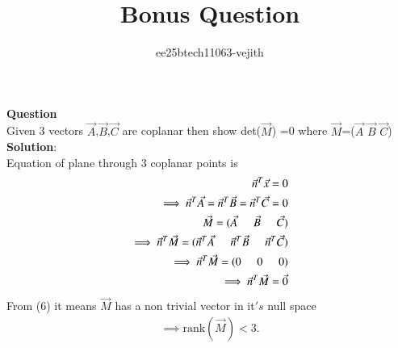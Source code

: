 \documentclass[journal]{IEEEtran}
\begin{document}

\vspace{3cm}

\title{Bonus Question}
\author{ee25btech11063-vejith}

\maketitle
{\let\newpage\relax\maketitle}
\renewcommand{\thefigure}{\theenumi}
\renewcommand{\thetable}{\theenumi}
\setlength{\intextsep}{10pt} %
\textbf{Question}\\
Given 3 vectors $\Vec{A}$,$\Vec{B}$,$\Vec{C}$ are coplanar then show det($\Vec{M}$) =0 where $\Vec{M}$=($\Vec{A}$  $\Vec{B}$  $\Vec{C}$)\\
\textbf{Solution}:\\
Equation of plane through 3 coplanar points is 
\begin{align}
    \Vec{n}^T\Vec{x}=0\\
    \implies \Vec{n}^T\Vec{A}= \Vec{n}^T\Vec{B} = \Vec{n}^T\Vec{C}=0\\
    \Vec{M}=(\Vec{A} \hspace{0.5cm} \Vec{B} \hspace{0.5cm} \Vec{C})\\
    \implies \Vec{n}^T\Vec{M}=(\Vec{n}^T\Vec{A} \hspace{0.5cm}  \Vec{n}^T\Vec{B} \hspace{0.5cm} \Vec{n}^T\Vec{C})\\
    \implies \Vec{n}^T\Vec{M}=(0\hspace{0.5cm} 0 \hspace{0.5cm} 0)\\
    \implies \Vec{n}^T\Vec{M}=\Vec{0}
    \end{align}
From (6) it means $\Vec{M}$ has a non trivial vector in it$'s$ null space
\begin{align}
    \implies \text{rank}(\Vec{M})<3.
\end{align}
\end{document}
